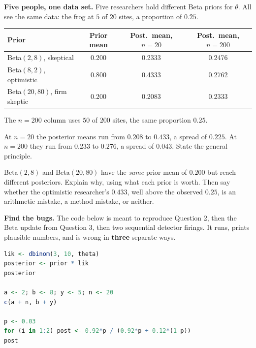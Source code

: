 \documentclass[11pt]{article}
\newcommand{\answerspace}[1]{\vspace{#1}}
\begin{document}
\begin{questions}
\item \textbf{Five people, one data set.} Five researchers hold different Beta priors for $\theta$.
All see the same data: the frog at $5$ of $20$ sites, a proportion of $0.25$.

\begin{center}
\renewcommand{\arraystretch}{1.3}
\begin{tabular}{lccc}
\toprule
\textbf{Prior} & \textbf{Prior mean} & \textbf{Post.\ mean, $n=20$} & \textbf{Post.\ mean, $n=200$} \\
\midrule
Beta$(2,8)$, skeptical & 0.200 & 0.2333 & 0.2476 \\
Beta$(8,2)$, optimistic & 0.800 & 0.4333 & 0.2762 \\
Beta$(20,80)$, firm skeptic & 0.200 & 0.2083 & 0.2333 \\
\bottomrule
\end{tabular}
\end{center}

\noindent The $n = 200$ column uses $50$ of $200$ sites, the same proportion $0.25$.

\begin{parts}
\item At $n = 20$ the posterior means run from $0.208$ to $0.433$, a spread of $0.225$. At
$n = 200$ they run from $0.233$ to $0.276$, a spread of $0.043$. State the general principle.
\answerspace{3.2em}

\item Beta$(2,8)$ and Beta$(20,80)$ have the \emph{same} prior mean of $0.200$ but reach different
posteriors. Explain why, using what each prior is worth. Then say whether the optimistic
researcher's $0.433$, well above the observed $0.25$, is an arithmetic mistake, a method mistake,
or neither.
\answerspace{5em}
\end{parts}

\item \textbf{Find the bugs.} The code below is meant to reproduce Question 2, then the Beta update
from Question 3, then two sequential detector firings. It runs, prints plausible numbers, and is
wrong in \textbf{three} separate ways.

\begin{lstlisting}[language=R]
lik <- dbinom(3, 10, theta)
posterior <- prior * lik
posterior

a <- 2; b <- 8; y <- 5; n <- 20
c(a + n, b + y)

p <- 0.03
for (i in 1:2) post <- 0.92*p / (0.92*p + 0.12*(1-p))
post
\end{lstlisting}


\end{questions}
\end{document}
